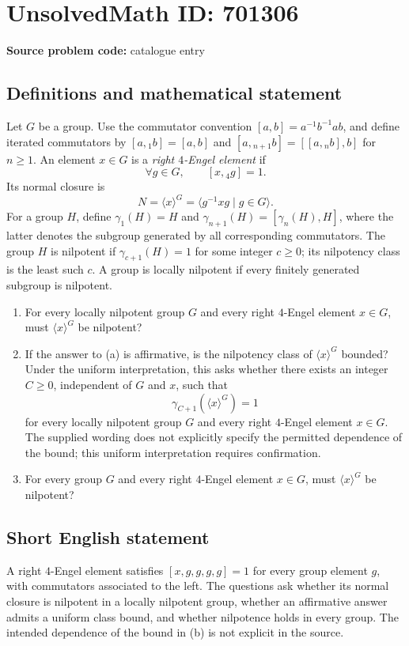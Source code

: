 \documentclass[11pt]{article}
\begin{document}
\section*{UnsolvedMath ID: 701306}
\textbf{Source problem code:} catalogue entry
\subsection{Definitions and mathematical statement}
Let \(G\) be a group. Use the commutator convention \([a,b]=a^{-1}b^{-1}ab\), and define iterated commutators by \([a,{}_1 b]=[a,b]\) and \([a,{}_{n+1}b]=[[a,{}_n b],b]\) for \(n\geq 1\). An element \(x\in G\) is a \emph{right \(4\)-Engel element} if
\[
\forall g\in G,\qquad [x,{}_4 g]=1.
\]
Its normal closure is
\[
N=\langle x\rangle^G=\langle g^{-1}xg\mid g\in G\rangle.
\]
For a group \(H\), define \(\gamma_1(H)=H\) and \(\gamma_{n+1}(H)=[\gamma_n(H),H]\), where the latter denotes the subgroup generated by all corresponding commutators. The group \(H\) is nilpotent if \(\gamma_{c+1}(H)=1\) for some integer \(c\geq 0\); its nilpotency class is the least such \(c\). A group is locally nilpotent if every finitely generated subgroup is nilpotent.

\begin{enumerate}
\item[(a)] For every locally nilpotent group \(G\) and every right \(4\)-Engel element \(x\in G\), must \(\langle x\rangle^G\) be nilpotent?
\item[(b)] If the answer to (a) is affirmative, is the nilpotency class of \(\langle x\rangle^G\) bounded? Under the uniform interpretation, this asks whether there exists an integer \(C\geq 0\), independent of \(G\) and \(x\), such that
\[
\gamma_{C+1}(\langle x\rangle^G)=1
\]
for every locally nilpotent group \(G\) and every right \(4\)-Engel element \(x\in G\). The supplied wording does not explicitly specify the permitted dependence of the bound; this uniform interpretation requires confirmation.
\item[(c)] For every group \(G\) and every right \(4\)-Engel element \(x\in G\), must \(\langle x\rangle^G\) be nilpotent?
\end{enumerate}
\subsection{Short English statement}
A right \(4\)-Engel element satisfies \([x,g,g,g,g]=1\) for every group element \(g\), with commutators associated to the left. The questions ask whether its normal closure is nilpotent in a locally nilpotent group, whether an affirmative answer admits a uniform class bound, and whether nilpotence holds in every group. The intended dependence of the bound in (b) is not explicit in the source.
\end{document}
